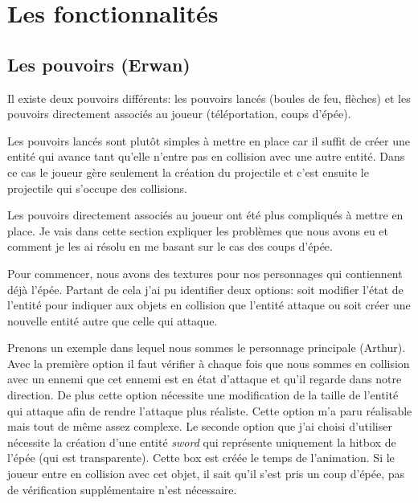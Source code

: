 \documentclass{article}
\begin{document}
\section{Les fonctionnalités}

\subsection{Les pouvoirs (Erwan)}

Il existe deux pouvoirs différents: les pouvoirs lancés (boules de feu, flèches) et les pouvoirs 
directement associés au joueur (téléportation, coups d'épée).

Les pouvoirs lancés sont plutôt simples à mettre en place car il suffit de créer une 
entité qui avance tant qu'elle n'entre pas en collision avec une autre entité. Dans ce cas le joueur 
gère seulement la création du projectile et c'est ensuite le projectile qui s'occupe des collisions.

Les pouvoirs directement associés au joueur ont été plus compliqués à mettre en place. Je vais 
dans cette section expliquer les problèmes que nous avons eu et comment je les ai résolu en me basant 
sur le cas des coups d'épée.

Pour commencer, nous avons des textures pour nos personnages qui contiennent déjà l'épée. Partant de cela
j'ai pu identifier deux options: soit modifier l'état de l'entité pour indiquer aux objets en collision 
que l'entité attaque ou soit créer une nouvelle entité autre que celle qui attaque.

Prenons un exemple dans lequel nous sommes le personnage principale (Arthur). Avec la première option il 
faut vérifier à chaque fois que nous sommes en collision avec un ennemi que cet ennemi est en état d'attaque 
et qu'il regarde dans notre direction. De plus cette option nécessite une modification de la taille de 
l'entité qui attaque afin de rendre l'attaque plus réaliste. Cette option m'a paru réalisable mais tout de 
même assez complexe. Le seconde option que j'ai choisi d'utiliser nécessite la création d'une entité 
\textit{sword} qui représente uniquement la hitbox de l'épée (qui est transparente). Cette box est créée 
le temps de l'animation. Si le joueur entre en collision avec cet objet, il sait qu'il s'est pris un 
coup d'épée, pas de vérification supplémentaire n'est nécessaire.
\end{document}
